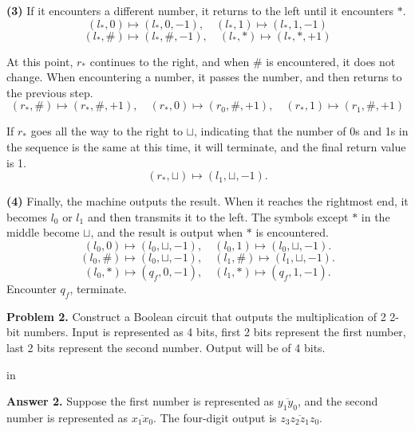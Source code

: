 \documentclass[11pt]{article}
\begin{document}
{\bf (3)} If it encounters a different number, it returns to the left until it encounters $\ast$.
$$
(l_{\ast}, 0) \mapsto (l_{\ast}, 0, -1), \quad (l_{\ast}, 1) \mapsto (l_{\ast}, 1, -1)
$$
$$
(l_{\ast}, \#) \mapsto (l_{\ast}, \#, -1), \quad (l_{\ast}, \ast) \mapsto (l_{\ast}, \ast, +1)
$$

At this point, $r_{\ast}$ continues to the right, and when $\#$ is encountered, it does not change. When encountering a number, it passes the number, and then returns to the previous step.
$$
(r_{\ast}, \#) \mapsto (r_{\ast}, \#, +1), \quad (r_{\ast}, 0) \mapsto (r_{0}, \#, +1), \quad (r_{\ast}, 1) \mapsto (r_1, \#, +1)
$$

If $r_{\ast}$ goes all the way to the right to $\sqcup$, indicating that the number of 0s and 1s in the sequence is the same at this time, it will terminate, and the final return value is 1.
$$
(r_{\ast}, \sqcup) \mapsto (l_1, \sqcup, -1).
$$

{\bf (4)} Finally, the machine outputs the result. When it reaches the rightmost end, it becomes $l_0$ or $l_1$ and then transmits it to the left. The symbols except $\ast$ in the middle become $\sqcup$, and the result is output when $\ast$ is encountered.
$$
(l_{0}, 0) \mapsto (l_{0}, \sqcup, -1),\quad (l_{0}, 1) \mapsto (l_{0}, \sqcup, -1).
$$
$$
(l_{0}, \#) \mapsto (l_{0}, \sqcup, -1),\quad (l_{1}, \#) \mapsto (l_{1}, \sqcup, -1).
$$
$$
(l_{0}, \ast) \mapsto (q_{f}, 0, -1),\quad (l_{1}, \ast) \mapsto (q_{f}, 1, -1).
$$
Encounter $q_f$, terminate.

\newpage
{\bf Problem 2.} Construct a Boolean circuit that outputs the multiplication of 2 2-bit numbers. Input is represented as 4 bits, first 2 bits represent the first number, last 2 bits represent the second number. Output will be of 4 bits.

 in

{\bf Answer 2.} Suppose the first number is represented as $\overline{y_1y_0}$, and the second number is represented as $\overline{x_1x_0}$. The four-digit output is $\overline{z_3z_2z_1z_0}$.
\end{document}

